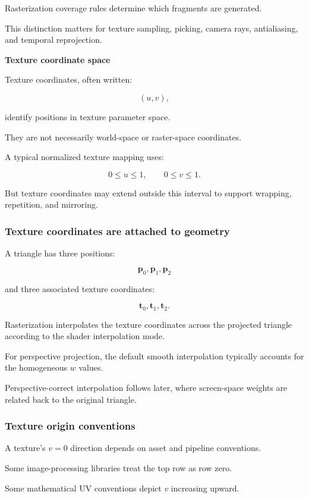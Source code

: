 Rasterization coverage rules determine which fragments are generated.

This distinction matters for texture sampling, picking, camera rays, antialiasing, and temporal reprojection.

\textbf{Texture coordinate space}

Texture coordinates, often written:

\[
 (u,v),
\]

identify positions in texture parameter space.

They are not necessarily world-space or raster-space coordinates.

A typical normalized texture mapping uses:

\[
 0\le u\le1,\qquad0\le v\le1.
\]

But texture coordinates may extend outside this interval to support wrapping, repetition, and mirroring.

\subsubsection{Texture coordinates are attached to geometry}\label{texture-coordinates-are-attached-to-geometry}

A triangle has three positions:

\[
 \mathbf p_0,\mathbf p_1,\mathbf p_2
\]

and three associated texture coordinates:

\[
 \mathbf t_0,\mathbf t_1,\mathbf t_2.
\]

Rasterization interpolates the texture coordinates across the projected triangle according to the shader interpolation mode.

For perspective projection, the default smooth interpolation typically accounts for the homogeneous \(w\) values.

Perspective-correct interpolation follows later, where screen-space weights are related back to the original triangle.

\subsubsection{Texture origin conventions}\label{texture-origin-conventions}

A texture's \(v=0\) direction depends on asset and pipeline conventions.

Some image-processing libraries treat the top row as row zero.

Some mathematical UV conventions depict \(v\) increasing upward.

